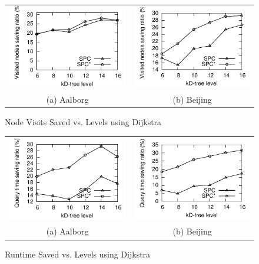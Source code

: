 \begin{figure}[htb]
\center
  \begin{tabular}{@{}c@{ }c@{}}
     \includegraphics[width=0.5\columnwidth]{figures/split_diffnodes_aal_server.pdf}
     &
     \includegraphics[width=0.5\columnwidth]{figures/split_diffnodes_bei_server.pdf}
      \\
     (a) Aalborg & (b)  Beijing
     \end{tabular}
\caption{Node Visits Saved vs. Levels using Dijkstra}
\label{fig:split_diffnodes_server}
\end{figure}


\begin{figure}[htb]
\center
  \begin{tabular}{@{}c@{ }c@{}}
     \includegraphics[width=0.5\columnwidth]{figures/split_diffruntime_aal_server.pdf}
     &
     \includegraphics[width=0.5\columnwidth]{figures/split_diffruntime_bei_server.pdf}
      \\
     (a) Aalborg & (b)  Beijing
     \end{tabular}
\caption{Runtime Saved vs. Levels using Dijkstra}
\label{fig:split_diffruntime_server}
\end{figure}


